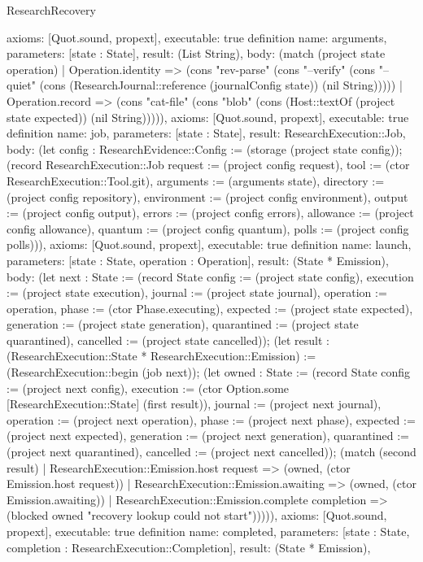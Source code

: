 \begin{lexlean}{ResearchRecovery}
\begin{semanticmodule}
{ axioms: [Quot.sound, propext],
 executable: true
}
definition{
 name: arguments,
 parameters: [state : State],
 result: (List String),
 body: (match (project state operation) | Operation.identity => (cons "rev-parse" (cons "--verify" (cons "--quiet" (cons (ResearchJournal::reference (journalConfig state)) (nil String))))) | Operation.record => (cons "cat-file" (cons "blob" (cons (Host::textOf (project state expected)) (nil String))))),
 axioms: [Quot.sound, propext],
 executable: true
}
definition{
 name: job,
 parameters: [state : State],
 result: ResearchExecution::Job,
 body: (let config : ResearchEvidence::Config := (storage (project state config)); (record ResearchExecution::Job {request := (project config request), tool := (ctor ResearchExecution::Tool.git), arguments := (arguments state), directory := (project config repository), environment := (project config environment), output := (project config output), errors := (project config errors), allowance := (project config allowance), quantum := (project config quantum), polls := (project config polls)})),
 axioms: [Quot.sound, propext],
 executable: true
}
definition{
 name: launch,
 parameters: [state : State, operation : Operation],
 result: (State * Emission),
 body: (let next : State := (record State {config := (project state config), execution := (project state execution), journal := (project state journal), operation := operation, phase := (ctor Phase.executing), expected := (project state expected), generation := (project state generation), quarantined := (project state quarantined), cancelled := (project state cancelled)}); (let result : (ResearchExecution::State * ResearchExecution::Emission) := (ResearchExecution::begin (job next)); (let owned : State := (record State {config := (project next config), execution := (ctor Option.some [ResearchExecution::State] (first result)), journal := (project next journal), operation := (project next operation), phase := (project next phase), expected := (project next expected), generation := (project next generation), quarantined := (project next quarantined), cancelled := (project next cancelled)}); (match (second result) | ResearchExecution::Emission.host request => (owned, (ctor Emission.host request)) | ResearchExecution::Emission.awaiting => (owned, (ctor Emission.awaiting)) | ResearchExecution::Emission.complete completion => (blocked owned "recovery lookup could not start"))))),
 axioms: [Quot.sound, propext],
 executable: true
}
definition{
 name: completed,
 parameters: [state : State, completion : ResearchExecution::Completion],
 result: (State * Emission),
}
\end{semanticmodule}
\end{lexlean}
